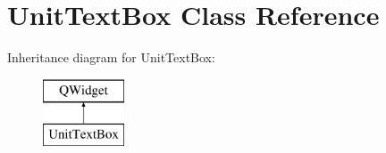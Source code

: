 \hypertarget{class_unit_text_box}{}\section{Unit\+Text\+Box Class Reference}
\label{class_unit_text_box}
Inheritance diagram for Unit\+Text\+Box\+:\begin{figure}[H]
\begin{center}
\leavevmode
\includegraphics[height=2.000000cm]{class_unit_text_box}
\end{center}
\end{figure}

